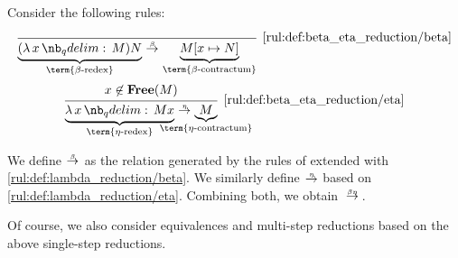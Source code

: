 \begin{definition}\label{def:beta_eta_reduction}
  Consider the following rules:
  \begin{TwoColumns}
    \begin{equation*}\taglabel[\ensuremath{ \logic{Red}_\beta }]{rul:def:beta_eta_reduction/beta}
      \begin{prooftree}
        \infer0[\ref{rul:def:beta_eta_reduction/beta}]{ \underbrace{(\qabs x M) N}_{\T{\term{\( \beta \)-redex}}} \bred \underbrace{M[x \mapsto N]}_{\T{\term{\( \beta \)-contractum}}} }.
      \end{prooftree}
    \end{equation*}
  \BeginSecondColumn
    \begin{equation*}\taglabel[\ensuremath{ \logic{Red}_\eta }]{rul:def:beta_eta_reduction/eta}
      \begin{prooftree}
        \hypo{ x \not\in \op*{Free}(M) }
        \infer1[\ref{rul:def:beta_eta_reduction/eta}]{ \underbrace{\qabs x M x}_{\T{\term{\( \eta \)-redex}}} \ered \underbrace{M}_{\mathclap{\T{\term{\( \eta \)-contractum}}}} }.
      \end{prooftree}
    \end{equation*}
  \end{TwoColumns}

  We define  \( {\bred} \) as the relation generated by the rules of  extended with \ref{rul:def:lambda_reduction/beta}. We similarly define  \( {\ered} \) based on \ref{rul:def:lambda_reduction/eta}. Combining both, we obtain  \( {\bered} \).
\end{definition}
\begin{comments}
  \item Of course, we also consider equivalences and multi-step reductions based on the above single-step reductions.
\end{comments}

